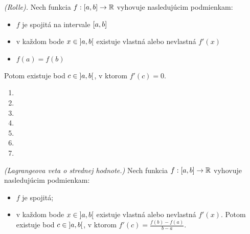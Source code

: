 \begin{veta}
\textit{(Rolle).}
Nech funkcia $f:\interval{a}{b} \rightarrow \mathbb{R}$ vyhovuje nasledujúcim
podmienkam:
\begin{itemize}
\item $f$ je spojitá na intervale $\interval{a}{b}$
\item
  v každom bode $x\in \interval[open]{a}{b}$ existuje vlastná alebo nevlastná
  $f'(x)$
\item $f(a)=f(b)$
\end{itemize}
Potom existuje bod $c\in \interval[open]{a}{b}$, v ktorom $f'(c)=0$.
\end{veta}

\begin{enumerate}[resume]
  \item {}
  \item {}
  \item {}
  \item {}
  \item {}
  \item {}
  \item {}
\end{enumerate}

\begin{veta}
\textit{(Lagrangeova veta o strednej hodnote.)}
Nech funkcia $f:\interval{a}{b} \rightarrow\mathbb{R}$ vyhovuje nasledujúcim
podmienkam:
\begin{itemize}
\item $f$ je spojitá;
\item
  v každom bode $x\in \interval[open]{a}{b}$ existuje vlastná alebo nevlastná
  $f'(x)$. Potom existuje bod $c\in \interval[open]{a}{b}$, v ktorom
  $f'(c)=\frac{f(b)-f(a)}{b-a}.$
\end{itemize}
\end{veta}

